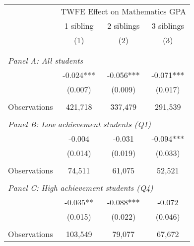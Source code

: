 \makeatletter
{}
{
\makeatother
\begin{tabular}{lccc}
\toprule
\cmidrule(lr){2-4}
& \multicolumn{3}{c}{TWFE Effect on Mathematics GPA} \\
\cmidrule(lr){2-4}
& 1 sibling & 2 siblings & 3 siblings  \\
\cmidrule(lr){2-2} \cmidrule(lr){3-3} \cmidrule(lr){4-4}
& (1) & (2) & (3)\\
\bottomrule
&  &  &  \\
&  &  &   \\
\multicolumn{4}{l}{\textit{Panel A: All students}} \\
\hspace{3mm}        &      -0.024***&      -0.056***&      -0.071***\\
                    &     (0.007)   &     (0.009)   &     (0.017)   \\
                    &               &               &               \\
\hspace{3mm}Observations&     421,718   &     337,479   &     291,539   \\
 
&  &  &   \\
\multicolumn{4}{l}{\textit{Panel B: Low achievement students (Q1)}} \\
\hspace{3mm}        &      -0.004   &      -0.031   &      -0.094***\\
                    &     (0.014)   &     (0.019)   &     (0.033)   \\
                    &               &               &               \\
\hspace{3mm}Observations&      74,511   &      61,075   &      52,521   \\
 
&  &  &   \\
\multicolumn{4}{l}{\textit{Panel C: High achievement students (Q4)}} \\
\hspace{3mm}        &      -0.035** &      -0.088***&      -0.072   \\
                    &     (0.015)   &     (0.022)   &     (0.046)   \\
                    &               &               &               \\
\hspace{3mm}Observations&     103,549   &      79,077   &      67,672   \\
 

\end{tabular}}
